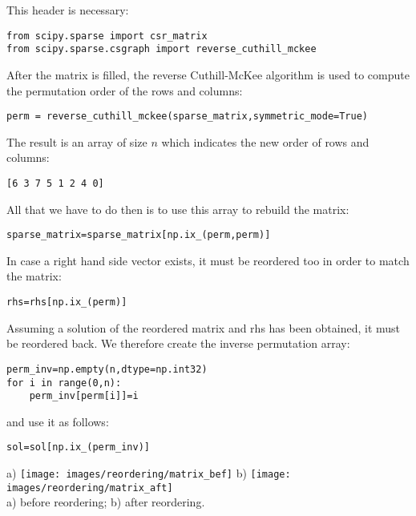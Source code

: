 This header is necessary:
\begin{lstlisting}
from scipy.sparse import csr_matrix
from scipy.sparse.csgraph import reverse_cuthill_mckee
\end{lstlisting}
After the matrix is filled, the reverse Cuthill-McKee algorithm is used to compute the 
permutation order of the rows and columns:
\begin{lstlisting}
perm = reverse_cuthill_mckee(sparse_matrix,symmetric_mode=True)
\end{lstlisting}
The result is an array of size $n$ which indicates the new order of rows and columns:
\begin{lstlisting}
[6 3 7 5 1 2 4 0]
\end{lstlisting}
All that we have to do then is to use this array to rebuild the matrix:
\begin{lstlisting}
sparse_matrix=sparse_matrix[np.ix_(perm,perm)]
\end{lstlisting}
In case a right hand side vector exists, it must be reordered too in order to match the matrix:
\begin{lstlisting}
rhs=rhs[np.ix_(perm)]
\end{lstlisting}
Assuming a solution of the reordered matrix and rhs has been obtained, it must be reordered back.
We therefore create the inverse permutation array:
\begin{lstlisting}
perm_inv=np.empty(n,dtype=np.int32)
for i in range(0,n):
    perm_inv[perm[i]]=i
\end{lstlisting}
and use it as follows:
\begin{lstlisting}
sol=sol[np.ix_(perm_inv)]
\end{lstlisting}


\begin{center}
a) \texttt{[image: images/reordering/matrix\_bef]}
b) \texttt{[image: images/reordering/matrix\_aft]}\\
{\captionfont a) before reordering; b) after reordering.}
\end{center}

